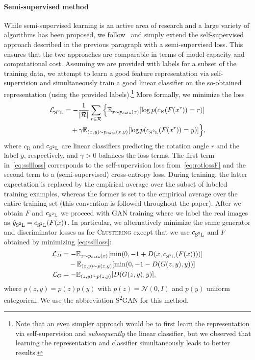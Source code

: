 \documentclass{article}
\newcommand{\pdata}{p_{\rm{data}}}
\newcommand{\E}{\mathbb{E}}
\newcommand{\Ls}{\mathcal{L}}
\newcommand{\cSSL}{c_\text{S\textsuperscript{2}L}}
\newcommand{\ySSL}{\hat y_\text{S\textsuperscript{2}L}}
\newcommand{\cRot}{c_\text{R}}
\newcommand{\xR}{x^r}
\newcommand{\tranSS}{\textsc{S\textsuperscript{2}GAN}}
\newcommand{\tranC}{\textsc{Clustering}}
\begin{document}
\paragraph{Semi-supervised method}
While semi-supervised learning is an active area of research and a large variety of algorithms has been proposed, we follow~\citet{zhai2019s4l} and simply extend the self-supervised approach described in the previous paragraph with a semi-supervised loss. This ensures that the two approaches are comparable in terms of model capacity and computational cost. Assuming we are provided with labels for a subset of the training data, we attempt to learn a good feature representation via self-supervision and simultaneously train a good linear classifier on the so-obtained representation (using the provided labels).\footnote{Note that an even simpler approach would be to first learn the representation via self-supervision and \emph{subsequently} the linear classifier, but we observed that learning the representation and classifier simultaneously leads to better results.} More formally, we minimize the loss
\begin{align} 
\Ls_\text{S\textsuperscript{2}L} &= - \frac{1}{|\mathcal{R}|} \sum_{r \in \mathcal{R}} \Big\{\E_{x \sim \pdata(x)}[\log p(\cRot(F(\xR))=r)] \nonumber \\
&\quad+  \gamma \E_{(x, y) \sim \pdata(x,y)}[\log p(\cSSL(F(\xR))=y)]\Big\}, \label{eq:ssllloss}
\end{align}
where $\cRot$ and $\cSSL$ are linear classifiers predicting the rotation angle $r$ and the label $y$, respectively, and $\gamma>0$ balances the loss terms. The first term in~\eqref{eq:ssllloss} corresponds to the self-supervision loss from~\eqref{eq:rotlossF} and the second term to a (semi-supervised) cross-entropy loss. During training, the latter expectation is replaced by the empirical average over the subset of labeled training examples, whereas the former is set to the empirical average over the entire training set (this convention is followed throughout the paper). After we obtain $F$ and $\cSSL$ we proceed with GAN training where we label the real images as $\ySSL = \cSSL(F(x))$. In particular, we alternatively minimize the same generator and discriminator losses as for \tranC{} except that we use $\cSSL$ and $F$ obtained by minimizing \eqref{eq:ssllloss}:
\begin{align*}
\Ls_D &= - \E_{x \sim \pdata(x)}[\min(0, -1+D(x,\cSSL(F(x))))] \\
      & \quad- \E_{(z,y) \sim p(z,y)}[\min(0,-1-D(G(z,y),y))] \\
\Ls_G &= -\E_{(z,y)\sim p(z,y)}[D(G(z,y),y)],
\end{align*}
where $p(z,y)= p(z)p(y)$ with $p(z)=\mathcal{N}(0,I)$ and $p(y)$ uniform categorical. We use the abbreviation \tranSS{} for this method.
\end{document}
